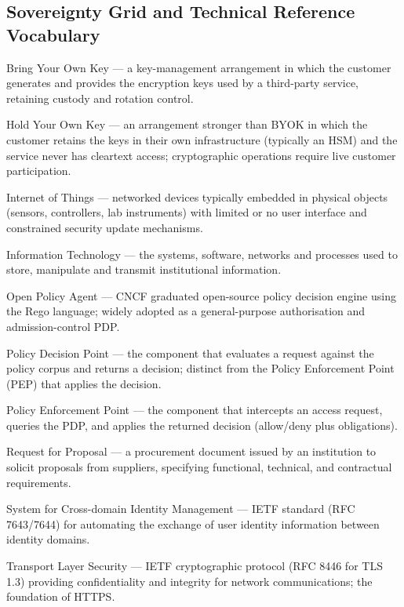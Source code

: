 \subsection*{Sovereignty Grid and Technical Reference Vocabulary}

\begin{description}[style=nextline, leftmargin=2.5cm, font=\normalfont\bfseries]
    \item[\glstarget{byok}BYOK] Bring Your Own Key --- a key-management arrangement in which the customer generates and provides the encryption keys used by a third-party service, retaining custody and rotation control.
    \item[\glstarget{hyok}HYOK] Hold Your Own Key --- an arrangement stronger than BYOK in which the customer retains the keys in their own infrastructure (typically an HSM) and the service never has cleartext access; cryptographic operations require live customer participation.
    \item[\glstarget{iot}IoT] Internet of Things --- networked devices typically embedded in physical objects (sensors, controllers, lab instruments) with limited or no user interface and constrained security update mechanisms.
    \item[\glstarget{it}IT] Information Technology --- the systems, software, networks and processes used to store, manipulate and transmit institutional information.
    \item[\glstarget{opa}OPA] Open Policy Agent --- CNCF graduated open-source policy decision engine using the Rego language; widely adopted as a general-purpose authorisation and admission-control PDP.
    \item[\glstarget{pdp}PDP] Policy Decision Point --- the component that evaluates a request against the policy corpus and returns a decision; distinct from the Policy Enforcement Point (PEP) that applies the decision.
    \item[\glstarget{pep}PEP] Policy Enforcement Point --- the component that intercepts an access request, queries the PDP, and applies the returned decision (allow/deny plus obligations).
    \item[\glstarget{rfp}RFP] Request for Proposal --- a procurement document issued by an institution to solicit proposals from suppliers, specifying functional, technical, and contractual requirements.
    \item[\glstarget{scim}SCIM] System for Cross-domain Identity Management --- IETF standard (RFC 7643/7644) for automating the exchange of user identity information between identity domains.
    \item[\glstarget{tls}TLS] Transport Layer Security --- IETF cryptographic protocol (RFC 8446 for TLS 1.3) providing confidentiality and integrity for network communications; the foundation of HTTPS.
\end{description}

